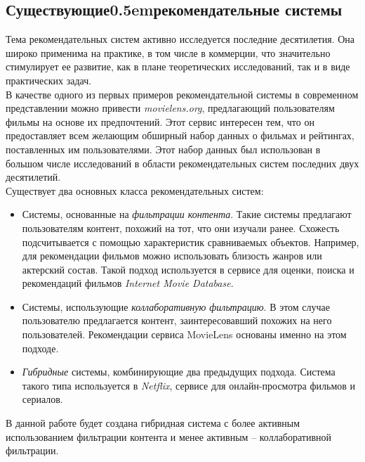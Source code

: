 \documentclass[12pt]{article}
\begin{document}
\subsection{Существующие{\kern 0.5em}рекомендательные системы}

\indent Тема рекомендательных систем активно исследуется последние десятилетия\cite{goldberg1992using}\cite{Mahmood}\cite{Anand}. Она широко применима на практике, в том числе в коммерции, что значительно стимулирует ее развитие, как в плане теоретических исследований, так и в виде практических задач. 
\\\indent В качестве одного из первых примеров рекомендательной системы в современном представлении можно привести \textit{movielens.org}\cite{movielens}, предлагающий пользователям фильмы на основе их предпочтений. Этот сервис интересен тем, что он предоставляет всем желающим обширный набор данных о фильмах и рейтингах, поставленных им пользователями. Этот набор данных был использован в большом числе исследований в области рекомендательных систем последних двух десятилетий.  
\\\indent Существует два основных класса рекомендательных систем\cite{rec_sys_handbook}:
\begin{itemize}
    \item Системы, основанные на \textit{фильтрации контента}. Такие системы предлагают пользователям контент, похожий на тот, что они изучали ранее. Схожесть подсчитывается с помощью характеристик сравниваемых объектов. Например, для рекомендации фильмов можно использовать близость жанров или актерский состав. Такой подход используется в сервисе для оценки, поиска и рекомендаций фильмов \textit{Internet Movie Database}\cite{imdb}.
    \item Системы, использующие \textit{коллаборативную фильтрацию}. В этом случае пользователю предлагается контент, заинтересовавший похожих на него пользователей. Рекомендации сервиса MovieLens основаны именно на этом подходе.
    \item \textit{Гибридные} системы, комбинирующие два предыдущих подхода. Система такого типа используется в  \textit{Netflix}\cite{netflix}, сервисе для онлайн-просмотра фильмов и сериалов.
\end{itemize}

\indent В данной работе будет создана гибридная система с более активным использованием фильтрации контента и менее активным -- коллаборативной фильтрации.
\end{document}
